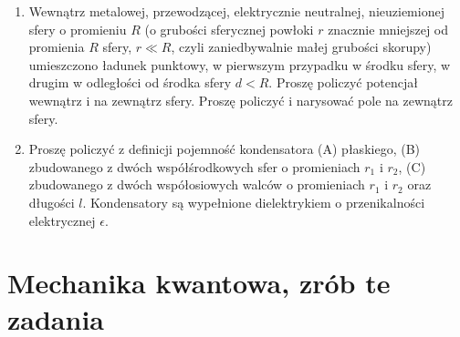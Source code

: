 \documentclass[a4paper,11pt]{article}
\begin{document}
\begin{enumerate}
\item Wewnątrz metalowej, przewodzącej, elektrycznie neutralnej,
  nieuziemionej sfery o promieniu $R$ (o grubości sferycznej powłoki
  $r$ znacznie mniejszej od promienia $R$ sfery, $r \ll R$, czyli
  zaniedbywalnie małej grubości skorupy) umieszczono ładunek punktowy,
  w pierwszym przypadku w środku sfery, w drugim w odległości od
  środka sfery $d < R$. Proszę policzyć potencjał wewnątrz i na
  zewnątrz sfery. Proszę policzyć i narysować pole na zewnątrz sfery.

\item Proszę policzyć z definicji pojemność kondensatora (A) płaskiego, (B) zbudowanego z dwóch współśrodkowych sfer o promieniach $r_{ 1 }$ i $r_{ 2 }$, (C) zbudowanego z dwóch współosiowych walców o promieniach $r_{ 1 }$ i $r_{ 2 }$ oraz długości $l$. Kondensatory są wypełnione dielektrykiem o przenikalności elektrycznej $\epsilon$.

\end{enumerate}










\section{Mechanika kwantowa, zrób te zadania}


\end{document}

